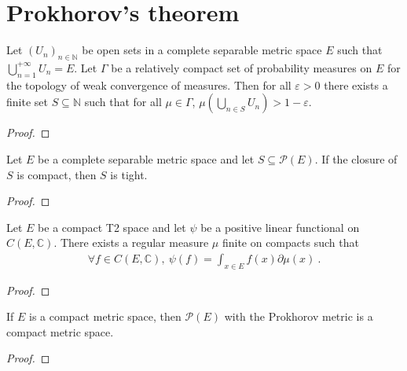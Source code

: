 \section{Prokhorov's theorem}

\begin{lemma}\label{lem:exists_finite_union_inter_lt}
Let $(U_n)_{n \in \mathbb{N}}$ be open sets in a complete separable metric space $E$ such that $\bigcup_{n=1}^{+ \infty} U_n = E$. Let $\Gamma$ be a relatively compact set of probability measures on $E$ for the topology of weak convergence of measures. Then for all $\varepsilon > 0$ there exists a finite set $S \subseteq \mathbb{N}$ such that for all $\mu \in \Gamma$, $\mu(\bigcup_{n \in S} U_n) > 1 - \varepsilon$.
\end{lemma}

\begin{proof}
\end{proof}

\begin{lemma}\label{lem:prokhorov_aux1}
Let $E$ be a complete separable metric space and let $S \subseteq \mathcal P(E)$. If the closure of $S$ is compact, then $S$ is tight.
\end{lemma}

\begin{proof}
\end{proof}

\begin{theorem}\label{thm:riesz_markov_kakutani}
Let $E$ be a compact T2 space and let $\psi$ be a positive linear functional on $C(E, \mathbb{C})$. There exists a regular measure $\mu$ finite on compacts such that
\begin{align*}
\forall f \in C(E, \mathbb{C}), \ \psi(f) = \int_{x \in E} f(x) \partial\mu(x) \: .
\end{align*}
\end{theorem}

\begin{proof}
\end{proof}

\begin{lemma}\label{lem:ProbabilityMeasure_compact}
If $E$ is a compact metric space, then $\mathcal P(E)$ with the Prokhorov metric is a compact metric space.
\end{lemma}

\begin{proof}
\end{proof}

